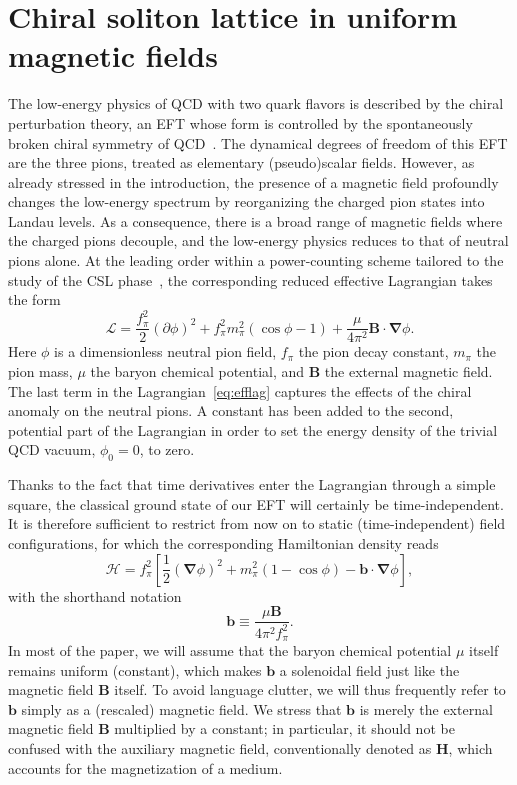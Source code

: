 \documentclass[pdflatex,iicol,sn-mathphys-num]{sn-jnl}
\let\m=\mu
\let\p=\phi
\let\de=\partial
\newcommand{\Ha}{\mathscr{H}}%
\newcommand{\La}{\mathscr{L}}%
\newcommand{\vek}[1]{\bm{#1}}%
\newcommand{\grad}{\vek\nabla}%
\newcommand{\bmag}{b}%
\begin{document}

\section{Chiral soliton lattice in uniform magnetic fields}
\label{sec:uniformB}

The low-energy physics of QCD with two quark flavors is described by the chiral perturbation theory, an EFT whose form is controlled by the spontaneously broken chiral symmetry of QCD~\cite{Scherer2012a}. The dynamical degrees of freedom of this EFT are the three pions, treated as elementary (pseudo)scalar fields. However, as already stressed in the introduction, the presence of a magnetic field profoundly changes the low-energy spectrum by reorganizing the charged pion states into Landau levels. As a consequence, there is a broad range of magnetic fields where the charged pions decouple, and the low-energy physics reduces to that of neutral pions alone. At the leading order within a power-counting scheme tailored to the study of the CSL phase~\cite{Brauner:2021sci}, the corresponding reduced effective Lagrangian takes the form
\begin{equation}
\La=\frac{f_\pi^2}{2}(\de\p)^2+f_\pi^2m_\pi^2(\cos\p-1)+\frac\m{4\pi^2}\vek B\cdot\grad\p.
\label{eq:efflag}
\end{equation}
Here $\p$ is a dimensionless neutral pion field, $f_\pi$ the pion decay constant, $m_\pi$ the pion mass, $\m$ the baryon chemical potential, and $\vek B$ the external magnetic field. The last term in the Lagrangian~\eqref{eq:efflag} captures the effects of the chiral anomaly on the neutral pions. A constant has been added to the second, potential part of the Lagrangian in order to set the energy density of the trivial QCD vacuum, $\p_0=0$, to zero.

Thanks to the fact that time derivatives enter the Lagrangian through a simple square, the classical ground state of our EFT will certainly be time-independent. It is therefore sufficient to restrict from now on to static (time-independent) field configurations, for which the corresponding Hamiltonian density reads
\begin{equation}
\Ha=f_\pi^2\left[\frac12(\grad\p)^2+m_\pi^2(1-\cos\p)-\vek\bmag\cdot\grad\p\right],
\label{eq:effham}
\end{equation}
with the shorthand notation
\begin{equation}
\vek\bmag\equiv\frac{\m\vek B}{4\pi^2f_\pi^2}.
\label{eq:defH}
\end{equation}
In most of the paper, we will assume that the baryon chemical potential $\m$ itself remains uniform (constant), which makes $\vek\bmag$ a solenoidal field just like the magnetic field $\vek B$ itself. To avoid language clutter, we will thus frequently refer to $\vek\bmag$ simply as a (rescaled) magnetic field. We stress that $\vek\bmag$ is merely the external magnetic field $\vek B$ multiplied by a constant; in particular, it should not be confused with the auxiliary magnetic field, conventionally denoted as $\vek H$, which accounts for the magnetization of a medium.
\end{document}
